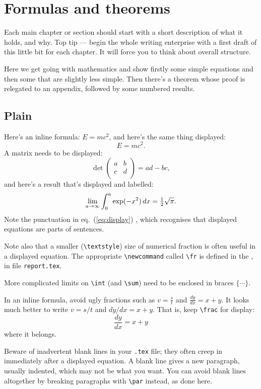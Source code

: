 \chapter{Formulas and theorems}\label{sec:formulas}
Each main chapter or section should start with a short description of
what it holds, and why. Top tip --- begin the whole writing enterprise
with a first draft of this little bit for each chapter. It will force
you to think about overall structure.
\par
Here we get going with mathematics and show firstly some simple
equations and then some that are slightly less simple. Then there's a
theorem whose proof is relegated to an appendix, followed by some
numbered results.
%
\section{Plain}
Here's an inline formula: \(E=mc^2\), and here's the same
thing displayed:\[E=mc^2.\]A matrix needs to be displayed:
\[  \det\left(\begin{array}{cc}
        a & b \\  c & d \\
      \end{array}\right) = ad-bc,   \]
and here's a result that's displayed and labelled:
\begin{equation}\label{eq:display}
\lim_{a\to\infty}\int_0^a\exp(-x^2)\,dx={\textstyle\frac{1}{2}}\sqrt\pi.
\end{equation}Note the punctuation in eq.~(\ref{eq:display}) \etc,
which recognises that displayed equations are parts of sentences.
\par
Note also that a smaller (\verb+\textstyle+) size of numerical fraction
is often useful in a displayed equation. The appropriate
\verb+\newcommand+ called \verb+\fr+ is defined in the
, in file \texttt{report.tex}.
\par
More complicated limits on \verb+\int+ (and \verb+\sum+) need to
be enclosed in braces $\{\cdots\}$.
\par
In an inline formula, avoid ugly fractions such as \(v=\frac st\) and
\(\frac{dy}{dx}=x+y\). It looks much better to write \(v=s/t\) and
\(dy/dx=x+y\). That is, keep \verb+\frac+ for
display:\[\frac{dy}{dx}=x+y\]where it belongs.
\par
Beware of inadvertent blank lines in your \texttt{.tex} file; they often
creep in immediately after a displayed equation. A blank line gives a
new paragraph, usually indented, which may not be what you want. You can 
avoid blank lines altogether by breaking paragraphs with \verb+\par+
instead, as done here.
%
